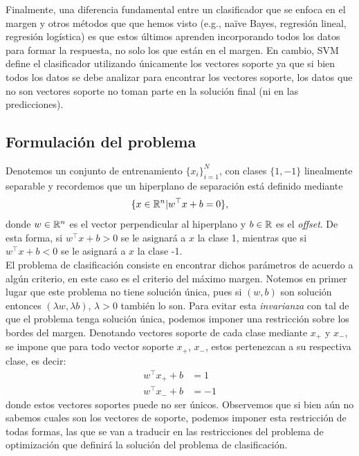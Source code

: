 Finalmente, una diferencia fundamental entre un clasificador que se enfoca en el margen y otros métodos que que hemos visto (e.g., na\"ive Bayes, regresión lineal, regresión logística) es que estos últimos aprenden incorporando todos los datos para formar la respuesta, no solo los que están en el margen. En cambio, SVM define el clasificador utilizando únicamente los vectores soporte ya que si bien todos los datos se debe analizar para encontrar los vectores soporte, los datos que no son vectores soporte no toman parte en la solución final (ni en las predicciones).

\subsection{Formulación del problema}

Denotemos un conjunto de entrenamiento $\{x_i\}_{i=1}^N$, con clases $\{1,-1\}$ linealmente separable y recordemos que un hiperplano de separación está definido mediante
\begin{equation}
    \{x\in \mathbb{R}^n | w^\top x + b = 0 \},\label{ec:hiperplano_svm}
\end{equation}
donde $w\in \mathbb{R}^n$ es el vector perpendicular al hiperplano y $b\in \mathbb{R}$ es el \emph{offset}. De esta forma, si $w^\top x + b >0$ se le asignará a $x$ la clase 1, mientras que si $w^\top x + b <0$ se le asignará a $x$ la clase -1.\\

El problema de clasificación consiste en encontrar dichos parámetros de acuerdo a algún criterio, en este caso es el criterio del máximo margen. Notemos en primer lugar que este problema no tiene solución única, pues si $(w,b)$ son solución entonces $(\lambda w, \lambda b)$, $\lambda>0$ también lo son. Para evitar esta \emph{invarianza} con tal de que el problema tenga solución única, podemos imponer una restricción sobre los bordes del margen. Denotando vectores soporte de cada clase mediante $x_{+}$ y $x_{-}$, se impone que para todo vector soporte $x_+$, $x_-$, estos pertenezcan a su respectiva clase, es decir:
\begin{align}
    w^\top x_{+} + b &= 1 \label{ec:borde_svm1}\\
    w^\top x_{-} + b &=  -1\label{ec:borde_svm2}
 \end{align}
 donde estos vectores soportes puede no ser únicos. Observemos que si bien aún no sabemos cuales son los vectores de soporte, podemos imponer esta restricción de todas formas, las que se van a traducir en las restricciones del problema de optimización que definirá la solución del problema de clasificación.\\
 
